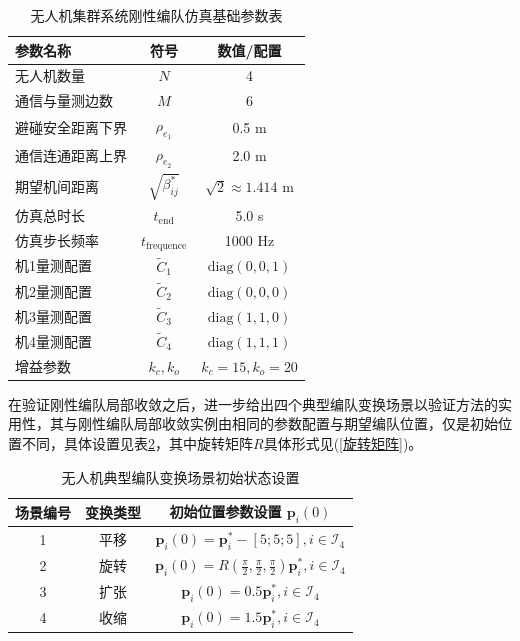 \begin{table}[H]
	\centering
	\caption{无人机集群系统刚性编队仿真基础参数表}
	\label{无人机集群系统刚性编队仿真基础参数表}
	\renewcommand{\arraystretch}{1.2}
	\begin{tabular}{lcc}
		\toprule
		\textbf{参数名称} & \textbf{符号} & \textbf{数值/配置} \\
		\midrule
		无人机数量 & $N$ & 4 \\
		通信与量测边数 & $M$ & 6 \\
		避碰安全距离下界 & $\rho_{e_1}$ & 0.5 m \\
		通信连通距离上界 & $\rho_{e_2}$ & 2.0 m \\
		期望机间距离 & $\sqrt{\beta_{ij}^*}$ & $\sqrt{2} \approx 1.414$ m \\
		仿真总时长 & $t_{\text{end}}$ & 5.0 s \\
		仿真步长频率 & $t_{\text{frequence}}$ & 1000 Hz \\
		机1量测配置 & $\tilde{C}_1$ & $\text{diag}(0, 0, 1)$ \\
		机2量测配置 & $\tilde{C}_2$ & $\text{diag}(0, 0, 0)$ \\
		机3量测配置 & $\tilde{C}_3$ & $\text{diag}(1, 1, 0)$ \\
		机4量测配置 & $\tilde{C}_4$ & $\text{diag}(1, 1, 1)$ \\
		增益参数 & $k_c,k_o$ & $k_c=15,k_o=20$ \\
		\bottomrule
	\end{tabular}
\end{table}

在验证刚性编队局部收敛之后，进一步给出四个典型编队变换场景以验证方法的实用性，其与刚性编队局部收敛实例由相同的参数配置与期望编队位置，仅是初始位置不同，具体设置见表\ref{无人机典型编队变换场景初始状态设置}，其中旋转矩阵$R$具体形式见(\ref{旋转矩阵})。

\begin{table}[htbp]
	\centering
	\caption{无人机典型编队变换场景初始状态设置}
	\label{无人机典型编队变换场景初始状态设置}
	\renewcommand{\arraystretch}{1.5}
	\begin{tabular}{c c c}
		\toprule
		\textbf{场景编号} & \textbf{变换类型} & \textbf{初始位置参数设置} $\mathbf{p}_i(0)$ \\
		\midrule
		1 & 平移 & $\mathbf{p}_i(0) = 
		\mathbf{p}_i^*-[5;5;5] , i \in \mathcal{I}_{4} $ \\
		2 & 旋转 & $\mathbf{p}_i(0) =  R(\frac{\pi}{2},\frac{\pi}{2},\frac{\pi}{2})\mathbf{p}_i^*,i \in \mathcal{I}_{4}$\\
		3 & 扩张 & $\mathbf{p}_i(0) =
		0.5 \mathbf{p}_i^* ,i \in \mathcal{I}_{4}$ \\
		4 & 收缩 & $\mathbf{p}_i(0)
		= 1.5 \mathbf{p}_i^*, i \in \mathcal{I}_{4}$\\
		\bottomrule
	\end{tabular}
\end{table}


